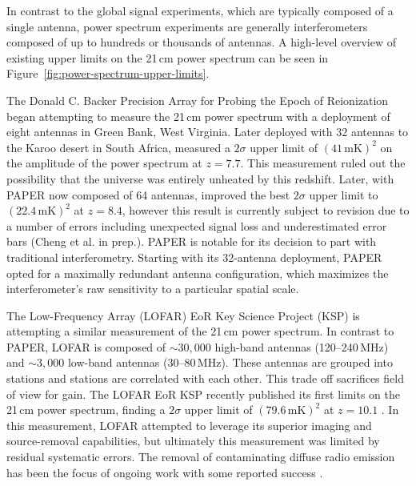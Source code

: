 \begin{bibunit}
In contrast to the global signal experiments, which are typically composed of a single antenna,
power spectrum experiments are generally interferometers composed of up to hundreds or thousands of
antennas. A high-level overview of existing upper limits on the 21\,cm power spectrum can be seen in
Figure~\ref{fig:power-spectrum-upper-limits}.

The Donald C. Backer Precision Array for Probing the Epoch of Reionization
\citep[PAPER;][]{2010AJ....139.1468P} began attempting to measure the 21\,cm power spectrum with a
deployment of eight antennas in Green Bank, West Virginia. Later deployed with 32 antennas to the
Karoo desert in South Africa, \citet{2014ApJ...788..106P} measured a $2\sigma$ upper limit of
$(41\,\text{mK})^2$ on the amplitude of the power spectrum at $z=7.7$. This measurement ruled out
the possibility that the universe was entirely unheated by this redshift.  Later, with PAPER now
composed of 64 antennas, \citet{2015ApJ...809...61A} improved the best $2\sigma$ upper limit to
$(22.4\,\text{mK})^2$ at $z=8.4$, however this result is currently subject to revision due to a
number of errors including unexpected signal loss and underestimated error bars (Cheng et al. in
prep.). PAPER is notable for its decision to part with traditional interferometry. Starting with its
32-antenna deployment, PAPER opted for a maximally redundant antenna configuration, which maximizes
the interferometer's raw sensitivity to a particular spatial scale.

The Low-Frequency Array (LOFAR) EoR Key Science Project (KSP) is attempting a similar measurement of
the 21\,cm power spectrum. In contrast to PAPER, LOFAR is composed of $\sim30,000$ high-band
antennas (120--240\,MHz) and $\sim3,000$ low-band antennas (30--80\,MHz). These antennas are grouped
into stations and stations are correlated with each other. This trade off sacrifices field of view
for gain. The LOFAR EoR KSP recently published its first limits on the 21\,cm power spectrum,
finding a $2\sigma$ upper limit of $(79.6\,\text{mK})^2$ at $z=10.1$ \citep{2017ApJ...838...65P}. In
this measurement, LOFAR attempted to leverage its superior imaging and source-removal capabilities,
but ultimately this measurement was limited by residual systematic errors. The removal of
contaminating diffuse radio emission has been the focus of ongoing work with some reported success
\citep{koopmans_2017}.


\end{bibunit}
